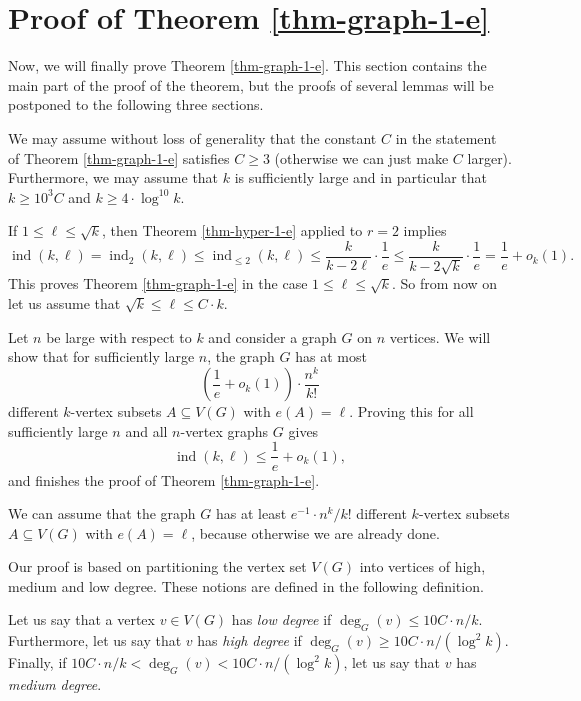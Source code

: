 \section{Proof of Theorem \ref{thm-graph-1-e}}\label{sect-proof-graph-1-e}

Now, we will finally prove Theorem \ref{thm-graph-1-e}. This section contains the main part of the proof of the theorem, but the proofs of several lemmas will be postponed to the following three sections.

We may assume without loss of generality that the constant $C$ in the statement of Theorem \ref{thm-graph-1-e} satisfies $C\geq 3$ (otherwise we can just make $C$ larger). Furthermore, we may assume that $k$ is sufficiently large and in particular that $k\geq 10^3 C$ and $k\geq 4\cdot \log^{10} k$.

If $1\leq \ell\leq \sqrt{k}$, then Theorem \ref{thm-hyper-1-e} applied to $r=2$ implies
\[\operatorname{ind}(k,\ell)=\operatorname{ind}_2(k,\ell)\leq \operatorname{ind}_{\leq 2}(k,\ell)\leq \frac{k}{k-2\ell}\cdot \frac{1}{e}\leq \frac{k}{k-2\sqrt{k}}\cdot \frac{1}{e}=\frac{1}{e}+o_k(1).\]
This proves Theorem \ref{thm-graph-1-e} in the case $1\leq \ell\leq \sqrt{k}$. So from now on let us assume that $\sqrt{k}\leq \ell\leq C\cdot k$.

Let $n$ be large with respect to $k$ and consider a graph $G$ on $n$ vertices. We will show that for sufficiently large $n$, the graph $G$ has at most
\[\left(\frac{1}{e}+o_k(1)\right)\cdot \frac{n^k}{k!}\]
different $k$-vertex subsets $A\subseteq V(G)$ with $e(A)=\ell$. Proving this for all sufficiently large $n$ and all $n$-vertex graphs $G$ gives
\[\operatorname{ind}(k,\ell)\leq \frac{1}{e}+o_k(1),\]
and finishes the proof of Theorem \ref{thm-graph-1-e}.

We can assume that the graph $G$ has at least $e^{-1}\cdot n^k/k!$ different $k$-vertex subsets $A\subseteq V(G)$ with $e(A)=\ell$, because otherwise we are already done.

Our proof is based on partitioning the vertex set $V(G)$ into vertices of high, medium and low degree. These notions are defined in the following definition.

\begin{definition}Let us say that a vertex $v\in V(G)$ has \emph{low degree} if $\deg_G(v)\leq 10C\cdot n/k$. Furthermore, let us say that $v$ has \emph{high degree} if $\deg_G(v)\geq 10C\cdot n/(\log^2 k)$. Finally, if $10C\cdot n/k<\deg_G(v)<10C\cdot n/(\log^2 k)$, let us say that $v$ has \emph{medium degree}.
\end{definition}

